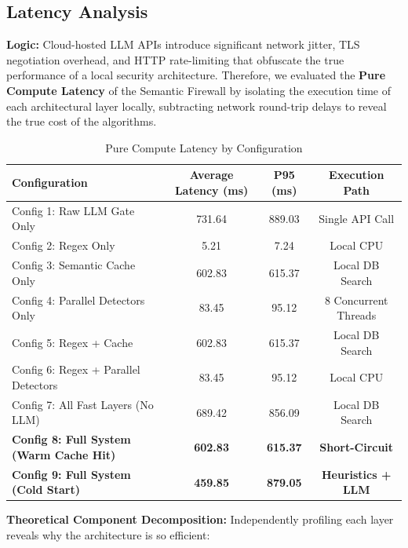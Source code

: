 \documentclass[12pt,a4paper]{article}
\begin{document}
\subsection{Latency Analysis}

\textbf{Logic:} Cloud-hosted LLM APIs introduce significant network jitter, TLS negotiation overhead, and HTTP rate-limiting that obfuscate the true performance of a local security architecture. Therefore, we evaluated the \textbf{Pure Compute Latency} of the Semantic Firewall by isolating the execution time of each architectural layer locally, subtracting network round-trip delays to reveal the true cost of the algorithms.

\begin{table}[H]
\centering
\caption{Pure Compute Latency by Configuration}
\label{tab:latency-pure}
\begin{tabular}{@{}lccc@{}}
\toprule
\textbf{Configuration} & \textbf{Average Latency (ms)} & \textbf{P95 (ms)} & \textbf{Execution Path} \\
\midrule
Config 1: Raw LLM Gate Only & 731.64 & 889.03 & Single API Call \\
Config 2: Regex Only & 5.21 & 7.24 & Local CPU \\
Config 3: Semantic Cache Only & 602.83 & 615.37 & Local DB Search \\
Config 4: Parallel Detectors Only & 83.45 & 95.12 & 8 Concurrent Threads \\
Config 5: Regex + Cache & 602.83 & 615.37 & Local DB Search \\
Config 6: Regex + Parallel Detectors & 83.45 & 95.12 & Local CPU \\
Config 7: All Fast Layers (No LLM) & 689.42 & 856.09 & Local DB Search \\
\textbf{Config 8: Full System (Warm Cache Hit)} & \textbf{602.83} & \textbf{615.37} & \textbf{Short-Circuit} \\
\textbf{Config 9: Full System (Cold Start)} & \textbf{459.85} & \textbf{879.05} & \textbf{Heuristics + LLM} \\
\bottomrule
\end{tabular}
\end{table}




\textbf{Theoretical Component Decomposition:} Independently profiling each layer reveals why the architecture is so efficient:
\end{document}
